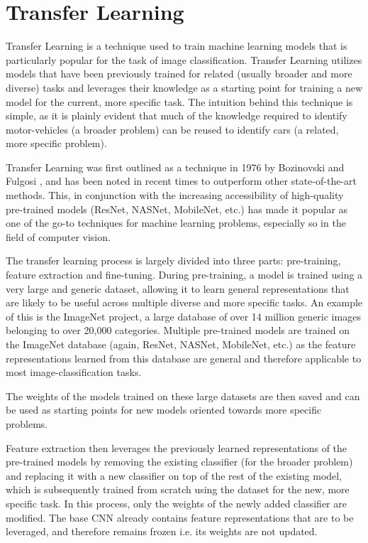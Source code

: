 \section{Transfer Learning}

Transfer Learning is a technique used to train machine learning models that is particularly popular for the task of image classification. Transfer Learning utilizes models that have been previously trained for related (usually broader and more diverse) tasks and leverages their knowledge as a starting point for training a new model for the current, more specific task. The intuition behind this technique is simple, as it is plainly evident that much of the knowledge required to identify motor-vehicles (a broader problem) can be reused to identify cars (a related, more specific problem).

Transfer Learning was first outlined as a technique in 1976 by Bozinovski and Fulgosi  \cite{16}, and has been noted in recent times to outperform other state-of-the-art methods. This, in conjunction with the increasing accessibility of high-quality pre-trained models (ResNet, NASNet, MobileNet, etc.) has made it popular as one of the go-to techniques for machine learning problems, especially so in the field of computer vision.

The transfer learning process is largely divided into three parts: pre-training, feature extraction and fine-tuning. During pre-training, a model is trained using a very large and generic dataset, allowing it to learn general representations that are likely to be useful across multiple diverse and more specific tasks. An example of this is the ImageNet project, a large database of over 14 million generic images belonging to over 20,000 categories. Multiple pre-trained models are trained on the ImageNet database (again, ResNet, NASNet, MobileNet, etc.) as the feature representations learned from this database are general and therefore applicable to most image-classification tasks.  

The weights of the models trained on these large datasets are then saved and can be used as starting points for new models oriented towards more specific problems. 

Feature extraction then leverages the previously learned representations of the pre-trained models by removing the existing classifier (for the broader problem) and replacing it with a new classifier on top of the rest of the existing model, which is subsequently trained from scratch using the dataset for the new, more specific task. In this process, only the weights of the newly added classifier are modified. The base CNN already contains feature representations that are to be leveraged, and therefore remains frozen i.e. its weights are not updated.

